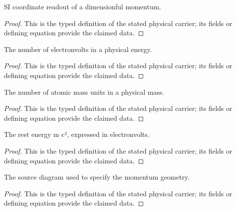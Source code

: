 \begin{definition}
  \label{def:physics:IPhO_2026_1_C_2:aux010}
  SI coordinate readout of a dimensionful momentum.
\end{definition}
\begin{proof}
  This is the typed definition of the stated physical carrier; its fields or defining equation provide the claimed data.
\end{proof}

\begin{definition}
  \label{def:physics:IPhO_2026_1_C_2:aux011}
  The number of electronvolts in a physical energy.
\end{definition}
\begin{proof}
  This is the typed definition of the stated physical carrier; its fields or defining equation provide the claimed data.
\end{proof}

\begin{definition}
  \label{def:physics:IPhO_2026_1_C_2:aux012}
  The number of atomic mass units in a physical mass.
\end{definition}
\begin{proof}
  This is the typed definition of the stated physical carrier; its fields or defining equation provide the claimed data.
\end{proof}

\begin{definition}
  \label{def:physics:IPhO_2026_1_C_2:aux013}
  The rest energy m c², expressed in electronvolts.
\end{definition}
\begin{proof}
  This is the typed definition of the stated physical carrier; its fields or defining equation provide the claimed data.
\end{proof}

\begin{definition}
  \label{def:physics:IPhO_2026_1_C_2:aux014}
  The source diagram used to specify the momentum geometry.
\end{definition}
\begin{proof}
  This is the typed definition of the stated physical carrier; its fields or defining equation provide the claimed data.
\end{proof}

